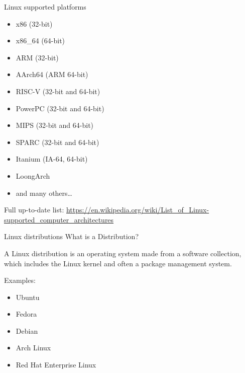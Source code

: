 \documentclass{beamer}
\begin{document}
\begin{frame}{Linux supported platforms}
  \begin{itemize}
    \item x86 (32-bit)
    \item x86\_64 (64-bit)
    \item ARM (32-bit)
    \item AArch64 (ARM 64-bit)
    \item RISC-V (32-bit and 64-bit)
    \item PowerPC (32-bit and 64-bit)
    \item MIPS (32-bit and 64-bit)
    \item SPARC (32-bit and 64-bit)
    \item Itanium (IA-64, 64-bit)
    \item LoongArch
    \item and many others\ldots
  \end{itemize}

  \footnotesize Full up-to-date list: \href{https://en.wikipedia.org/wiki/List_of_Linux-supported_computer_architectures}{https://en.wikipedia.org/wiki/List\_of\_Linux-supported\_computer\_architectures}
\end{frame}

\begin{frame}{Linux distributions}
  What is a Distribution?

  A Linux distribution is an operating system made from a software collection, which includes the Linux kernel and often a package management system.

  Examples:
  \begin{itemize}
    \item Ubuntu
    \item Fedora
    \item Debian
    \item Arch Linux
    \item Red Hat Enterprise Linux
  \end{itemize}
\end{frame}
\end{document}
